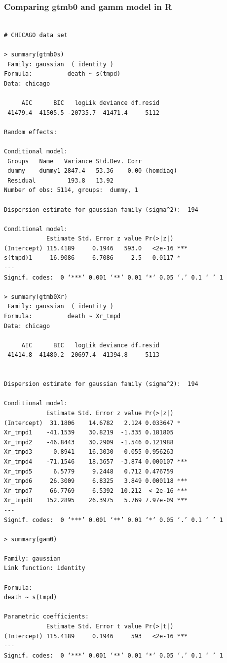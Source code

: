 \subsubsection{Comparing gtmb0 and gamm model in R}
\begin{verbatim}

# CHICAGO data set

> summary(gtmb0s)
 Family: gaussian  ( identity )
Formula:          death ~ s(tmpd)
Data: chicago

     AIC      BIC   logLik deviance df.resid 
 41479.4  41505.5 -20735.7  41471.4     5112 

Random effects:

Conditional model:
 Groups   Name   Variance Std.Dev. Corr          
 dummy    dummy1 2847.4   53.36    0.00 (homdiag)
 Residual         193.8   13.92                  
Number of obs: 5114, groups:  dummy, 1

Dispersion estimate for gaussian family (sigma^2):  194 

Conditional model:
            Estimate Std. Error z value Pr(>|z|)    
(Intercept) 115.4189     0.1946   593.0   <2e-16 ***
s(tmpd)1     16.9086     6.7086     2.5   0.0117 *  
---
Signif. codes:  0 ‘***’ 0.001 ‘**’ 0.01 ‘*’ 0.05 ‘.’ 0.1 ‘ ’ 1

> summary(gtmb0Xr)
 Family: gaussian  ( identity )
Formula:          death ~ Xr_tmpd
Data: chicago

     AIC      BIC   logLik deviance df.resid 
 41414.8  41480.2 -20697.4  41394.8     5113 


Dispersion estimate for gaussian family (sigma^2):  194 

Conditional model:
            Estimate Std. Error z value Pr(>|z|)    
(Intercept)  31.1806    14.6782   2.124 0.033647 *  
Xr_tmpd1    -41.1539    30.8219  -1.335 0.181805    
Xr_tmpd2    -46.8443    30.2909  -1.546 0.121988    
Xr_tmpd3     -0.8941    16.3030  -0.055 0.956263    
Xr_tmpd4    -71.1546    18.3657  -3.874 0.000107 ***
Xr_tmpd5      6.5779     9.2448   0.712 0.476759    
Xr_tmpd6     26.3009     6.8325   3.849 0.000118 ***
Xr_tmpd7     66.7769     6.5392  10.212  < 2e-16 ***
Xr_tmpd8    152.2895    26.3975   5.769 7.97e-09 ***
---
Signif. codes:  0 ‘***’ 0.001 ‘**’ 0.01 ‘*’ 0.05 ‘.’ 0.1 ‘ ’ 1

> summary(gam0)

Family: gaussian 
Link function: identity 

Formula:
death ~ s(tmpd)

Parametric coefficients:
            Estimate Std. Error t value Pr(>|t|)    
(Intercept) 115.4189     0.1946     593   <2e-16 ***
---
Signif. codes:  0 ‘***’ 0.001 ‘**’ 0.01 ‘*’ 0.05 ‘.’ 0.1 ‘ ’ 1


\end{verbatim}
